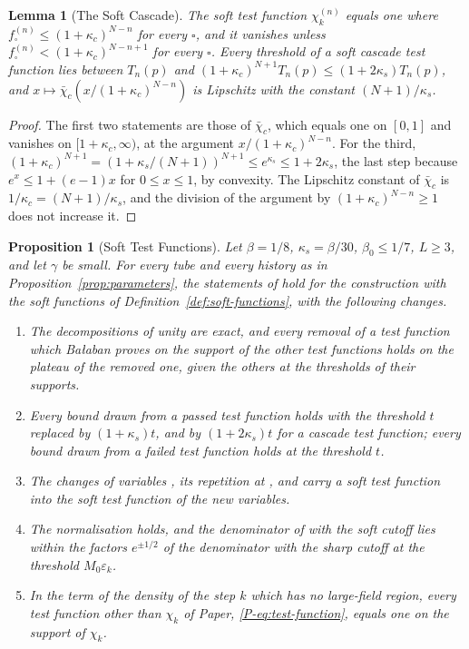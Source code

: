 \documentclass[11pt]{preprint}
\numberwithin{equation}{section}
\newtheorem{proposition}{Proposition}
\newtheorem{lemma}{Lemma}[section]
\theoremstyle{definition}
\theoremstyle{remark}
\theoremstyle{plain}
\begin{document}
\begin{lemma}[The Soft Cascade]\label{lem:soft-cascade}
The soft test function $\chi_k^{(n)}$ equals one where $f^{(n)}_\square \leq (1 + \kappa_c)^{N-n}$ for every $\square$, and it vanishes unless $f^{(n)}_\square < (1 + \kappa_c)^{N-n+1}$ for every $\square$. Every threshold of a soft cascade test function lies between $T_n(p)$ and $(1 + \kappa_c)^{N+1}T_n(p) \leq (1 + 2\kappa_s)T_n(p)$, and $x \mapsto \bar\chi_c(x/(1 + \kappa_c)^{N-n})$ is Lipschitz with the constant $(N + 1)/\kappa_s$.
\end{lemma}

\begin{proof}
The first two statements are those of $\bar\chi_c$, which equals one on $[0, 1]$ and vanishes on $[1 + \kappa_c, \infty)$, at the argument $x/(1 + \kappa_c)^{N-n}$. For the third, $(1 + \kappa_c)^{N+1} = (1 + \kappa_s/(N + 1))^{N+1} \leq e^{\kappa_s} \leq 1 + 2\kappa_s$, the last step because $e^x \leq 1 + (e - 1)x$ for $0 \leq x \leq 1$, by convexity. The Lipschitz constant of $\bar\chi_c$ is $1/\kappa_c = (N + 1)/\kappa_s$, and the division of the argument by $(1 + \kappa_c)^{N-n} \geq 1$ does not increase it.
\end{proof}

\begin{proposition}[Soft Test Functions]\label{prop:soft-tests}
Let $\beta = 1/8$, $\kappa_s = \beta/30$, $\beta_0 \leq 1/7$, $L \geq 3$, and let $\gamma$ be small. For every tube and every history as in Proposition~\ref{prop:parameters}, the statements of \cite{BalabanCRE,BalabanLFR1,BalabanLFR2} hold for the construction with the soft functions of Definition~\ref{def:soft-functions}, with the following changes.
\begin{enumerate}[label=(\alph*)]
\item The decompositions of unity are exact, and every removal of a test function which Ba{\l}aban proves on the support of the other test functions holds on the plateau of the removed one, given the others at the thresholds of their supports.
\item Every bound drawn from a passed test function holds with the threshold $t$ replaced by $(1 + \kappa_s)t$, and by $(1 + 2\kappa_s)t$ for a cascade test function; every bound drawn from a failed test function holds at the threshold $t$.
\item The changes of variables \cite[(1.22), p.~251]{BalabanCRE}, its repetition at \cite[p.~269]{BalabanCRE}, and \cite[(1.59), p.~188]{BalabanLFR1} carry a soft test function into the soft test function of the new variables.
\item The normalisation \cite[(1.102), p.~201]{BalabanLFR1} holds, and the denominator of \cite[(1.100)]{BalabanLFR1} with the soft cutoff lies within the factors $e^{\pm1/2}$ of the denominator with the sharp cutoff at the threshold $M_0\varepsilon_k$.
\item In the term of the density of the step $k$ which has no large-field region, every test function other than $\chi_k$ of Paper, \eqref{P-eq:test-function}, equals one on the support of $\chi_k$.
\end{enumerate}
\end{proposition}
\end{document}
